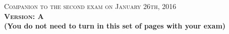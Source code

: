 \documentclass{docist}
\begin{document}
\thispagestyle{empty}

\begin{center}
  {\Large \textsc{Companion to the second exam on January 26th, 2016\\[2ex]
  \textbf{Version: A}\\[2ex]}}
  {\normalsize  \textbf{(You do not need to turn in this set of pages with your exam)}}
\end{center}




\qArchitectureInfluenceCycleTwo


\qRequirementsTwo


\qArchitectureDefinitionTwo


\qAdventureBuilderTwo


\qModuleComponentTwo


\qScenariosTacticsTwo


\qAvailabilityTwo


\qModifiabilityTwo


\qNginxScenariosTacticsTwo


\qPerformanceTwo


\qDesigningArchitectureTwo


\qContinousIntegrationScenariosTacticsTwo


\qInfinispanScenariosTacticsTwo


\qModuleViewtypeTwo


\qUsesGeneralizationTwo

\end{document}
